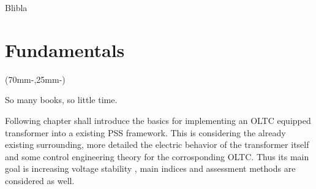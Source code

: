 Blibla


\chapter{Fundamentals}
\label{chap:fundamentals}

\begin{textblock*}{.7\textwidth}(70mm-\offset,25mm-\offset)
    \begin{fquote}
        So many books, so little time.
    \end{fquote}
\end{textblock*}

Following chapter shall introduce the basics for implementing an \acs{OLTC} equipped transformer into a existing \acs{PSS} framework. This is considering the already existing surrounding, more detailed the electric behavior of the transformer itself and some control engineering theory for the corrosponding \acs{OLTC}. Thus its main goal is increasing voltage stability \autocite{machowskiPowerSystemDynamics2020}, main indices and assessment methods are considered as well.

